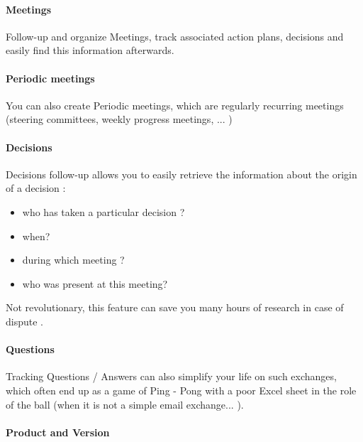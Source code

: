 \documentclass[letterpaper,10pt,english]{sphinxmanual}
\begin{document}
\paragraph{Meetings}

Follow-up and organize Meetings, track associated action plans, decisions and easily find this information afterwards.

\paragraph{Periodic meetings}

You can also create Periodic meetings, which are regularly recurring meetings (steering committees, weekly progress meetings, ... )

\paragraph{Decisions}

Decisions follow-up allows you to easily retrieve the information about the origin of a decision :
\begin{itemize}
\item {} 
who has taken a particular decision ?

\item {} 
when?

\item {} 
during which meeting ?

\item {} 
who was present at this meeting?

\end{itemize}

Not revolutionary, this feature can save you many hours of research in case of dispute .

\paragraph{Questions}

Tracking Questions / Answers can also simplify your life on such exchanges, which often end up as a game of Ping - Pong with a poor Excel sheet in the role of the ball (when it is not a simple email exchange... ).

\paragraph{Product and Version}
\end{document}
